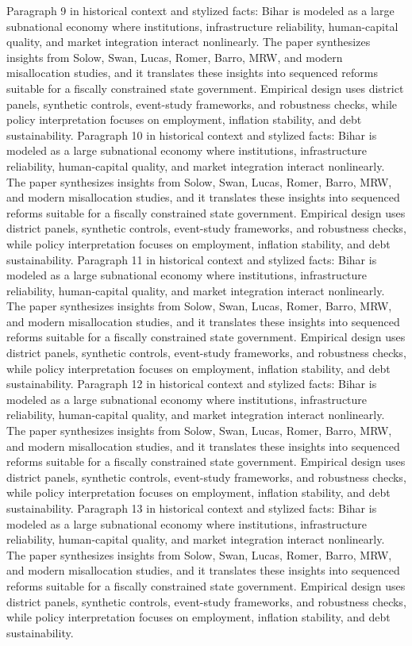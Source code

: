 \documentclass[preprint,12pt]{elsarticle}
\begin{document}
Paragraph 9 in historical context and stylized facts: Bihar is modeled as a large subnational economy where institutions, infrastructure reliability, human-capital quality, and market integration interact nonlinearly. The paper synthesizes insights from Solow, Swan, Lucas, Romer, Barro, MRW, and modern misallocation studies, and it translates these insights into sequenced reforms suitable for a fiscally constrained state government. Empirical design uses district panels, synthetic controls, event-study frameworks, and robustness checks, while policy interpretation focuses on employment, inflation stability, and debt sustainability.
Paragraph 10 in historical context and stylized facts: Bihar is modeled as a large subnational economy where institutions, infrastructure reliability, human-capital quality, and market integration interact nonlinearly. The paper synthesizes insights from Solow, Swan, Lucas, Romer, Barro, MRW, and modern misallocation studies, and it translates these insights into sequenced reforms suitable for a fiscally constrained state government. Empirical design uses district panels, synthetic controls, event-study frameworks, and robustness checks, while policy interpretation focuses on employment, inflation stability, and debt sustainability.
Paragraph 11 in historical context and stylized facts: Bihar is modeled as a large subnational economy where institutions, infrastructure reliability, human-capital quality, and market integration interact nonlinearly. The paper synthesizes insights from Solow, Swan, Lucas, Romer, Barro, MRW, and modern misallocation studies, and it translates these insights into sequenced reforms suitable for a fiscally constrained state government. Empirical design uses district panels, synthetic controls, event-study frameworks, and robustness checks, while policy interpretation focuses on employment, inflation stability, and debt sustainability.
Paragraph 12 in historical context and stylized facts: Bihar is modeled as a large subnational economy where institutions, infrastructure reliability, human-capital quality, and market integration interact nonlinearly. The paper synthesizes insights from Solow, Swan, Lucas, Romer, Barro, MRW, and modern misallocation studies, and it translates these insights into sequenced reforms suitable for a fiscally constrained state government. Empirical design uses district panels, synthetic controls, event-study frameworks, and robustness checks, while policy interpretation focuses on employment, inflation stability, and debt sustainability.
Paragraph 13 in historical context and stylized facts: Bihar is modeled as a large subnational economy where institutions, infrastructure reliability, human-capital quality, and market integration interact nonlinearly. The paper synthesizes insights from Solow, Swan, Lucas, Romer, Barro, MRW, and modern misallocation studies, and it translates these insights into sequenced reforms suitable for a fiscally constrained state government. Empirical design uses district panels, synthetic controls, event-study frameworks, and robustness checks, while policy interpretation focuses on employment, inflation stability, and debt sustainability.
\end{document}

